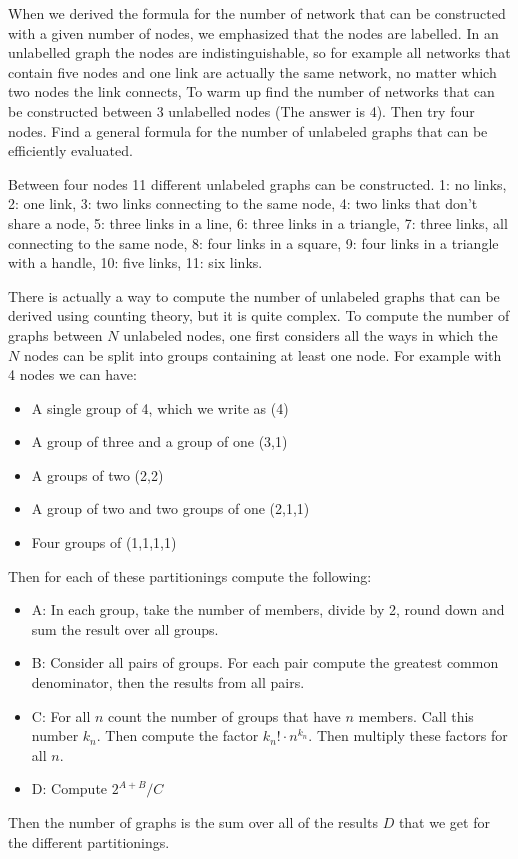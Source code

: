 



When we derived the formula for the number of network that can be constructed with a given number of nodes, we emphasized that the nodes are labelled. In an unlabelled graph the nodes are indistinguishable, so for example all networks that contain five nodes and  one link are actually the same network, no matter which two nodes the link connects, To warm up find the number of networks that can be constructed between 3 unlabelled nodes (The answer is 4). Then try four nodes. Find a general formula for the number of unlabeled graphs that can be efficiently evaluated.


\solution
Between four nodes 11 different unlabeled graphs can be constructed. 1: no links, 2: one link, 3: two links connecting to the same node, 4: two links that don't share a node, 5: three links in a line, 6: three links in a triangle, 7: three links, all connecting to the same node, 8: four links in a square, 9: four links in a triangle with a handle, 10: five links, 11: six links.

There is actually a way to compute the number of unlabeled graphs that can be derived using counting theory, but it is quite complex. To compute the number of graphs between $N$ unlabeled nodes, one first considers all the ways in which the $N$ nodes can be split into groups containing at least one node. For example with 4 nodes we can have:
\begin{itemize}
\item A single group of 4, which we write as (4)
\item A group of three and a group of one (3,1)
\item A groups of two (2,2) 
\item A group of two and two groups of one (2,1,1)
\item Four groups of (1,1,1,1)
\end{itemize}
Then for each of these partitionings compute the following:
\begin{itemize}
\item A: In each group, take the number of members, divide by 2, round down and sum the result over all groups.
\item B: Consider all pairs of groups. For each pair compute the greatest common denominator, then the results from all pairs.
\item C: For all $n$ count the number of groups that have $n$ members. Call this number $k_n$. Then compute the factor $k_n!\cdot n^{k_n}$. Then multiply these factors for all $n$.
\item D: Compute $2^{A+B}/C$  
\end{itemize}
Then the number of graphs is the sum over all of the results $D$ that we get for the different partitionings.   

